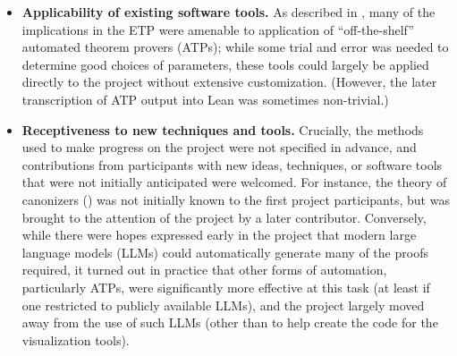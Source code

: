 \begin{itemize}
\item \textbf{Applicability of existing software tools.}  As described in , many of the implications in the ETP were amenable to application of ``off-the-shelf'' automated theorem provers (ATPs); while some trial and error was needed to determine good choices of parameters, these tools could largely be applied directly to the project without extensive customization.  (However, the later transcription of ATP output into Lean was sometimes non-trivial.)
\item \textbf{Receptiveness to new techniques and tools.}  Crucially, the methods used to make progress on the project were not specified in advance, and contributions from participants with new ideas, techniques, or software tools that were not initially anticipated were welcomed.  For instance, the theory of canonizers () was not initially known to the first project participants, but was brought to the attention of the project by a later contributor.  Conversely, while there were hopes expressed early in the project that modern large language models (LLMs) could automatically generate many of the proofs required, it turned out in practice that other forms of automation, particularly ATPs, were significantly more effective at this task (at least if one restricted to publicly available LLMs), and the project largely moved away from the use of such LLMs (other than to help create the code for the visualization tools).
\end{itemize}

